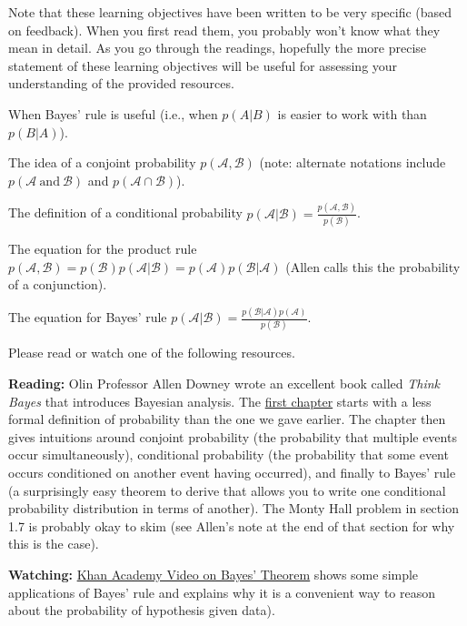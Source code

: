\documentclass[assignment01_Solutions]{subfiles}
\begin{document}
\begin{externalresources}[(60 minutes)]
\begin{learningobjectives}
Note that these learning objectives have been written to be very specific (based on feedback).  When you first read them, you probably won't know what they mean in detail.  As you go through the readings, hopefully the more precise statement of these learning objectives will be useful for assessing your understanding of the provided resources.

\bi
\item When Bayes' rule is useful (i.e., when $p(A|B)$ is easier to work with than $p(B|A)$).
\item The idea of a conjoint probability $p(\mathcal{A}, \mathcal{B})$ (note: alternate notations include $p(\mathcal{A}~\mbox{and}~\mathcal{B})$ and $p(\mathcal{A} \cap \mathcal{B})$).
\item The definition of a conditional probability $p(\mathcal{A} | \mathcal{B}) = \frac{p(\mathcal{A},\mathcal{B})}{p(\mathcal{B})}$.
\item The equation for the product rule $p(\mathcal{A}, \mathcal{B}) = p(\mathcal{B}) p(\mathcal{A} | \mathcal{B}) =  p(\mathcal{A}) p(\mathcal{B} | \mathcal{A})$ (Allen calls this the probability of a conjunction).
\item The equation for Bayes' rule $p(\mathcal{A} | \mathcal{B}) = \frac{p(\mathcal{B} | \mathcal{A}) p(\mathcal{A})}{p(\mathcal{B})}$.
\ei
\end{learningobjectives}

Please read or watch one of the following resources.

\textbf{Reading:} Olin Professor Allen Downey wrote an excellent book called \emph{Think Bayes} that introduces Bayesian analysis.  The \href{http://www.greenteapress.com/thinkbayes/html/thinkbayes002.html}{first chapter}  starts with a less formal definition of probability than the one we gave earlier.  The chapter then gives intuitions around conjoint probability (the probability that multiple events occur simultaneously), conditional probability (the probability that some event occurs conditioned on another event having occurred), and finally to Bayes' rule (a surprisingly easy theorem to derive that allows you to write one conditional probability distribution in terms of another).  The Monty Hall problem in section 1.7 is probably okay to skim (see Allen's note at the end of that section for why this is the case).

\textbf{Watching:} \href{https://www.khanacademy.org/partner-content/wi-phi/wiphi-critical-thinking/wiphi-fundamentals/v/bayes-theorem}{Khan Academy Video on Bayes' Theorem} shows some simple applications of Bayes' rule and explains why it is a convenient way to reason about the probability of hypothesis given data).


\end{externalresources}
\end{document}
